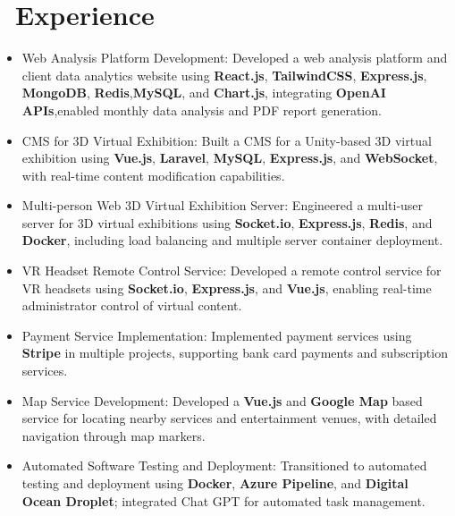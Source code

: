 \documentclass{resume}
\begin{document}
\section{\faUsers\ Experience}
\begin{itemize}[noitemsep]
  \item Web Analysis Platform Development: Developed a web analysis platform and client data analytics website using \textbf{React.js}, \textbf{TailwindCSS}, \textbf{Express.js}, \textbf{MongoDB}, \textbf{Redis},\textbf{MySQL}, and \textbf{Chart.js}, integrating \textbf{OpenAI APIs},enabled monthly data analysis and PDF report generation.
  \item CMS for 3D Virtual Exhibition: Built a CMS for a Unity-based 3D virtual exhibition using \textbf{Vue.js}, \textbf{Laravel}, \textbf{MySQL}, \textbf{Express.js}, and \textbf{WebSocket}, with real-time content modification capabilities.
  \item Multi-person Web 3D Virtual Exhibition Server: Engineered a multi-user server for 3D virtual exhibitions using \textbf{Socket.io}, \textbf{Express.js}, \textbf{Redis}, and \textbf{Docker}, including load balancing and multiple server container deployment.
  \item VR Headset Remote Control Service: Developed a remote control service for VR headsets using \textbf{Socket.io}, \textbf{Express.js}, and \textbf{Vue.js}, enabling real-time administrator control of virtual content.
  \item Payment Service Implementation: Implemented payment services using \textbf{Stripe} in multiple projects, supporting bank card payments and subscription services.
  \item Map Service Development: Developed a \textbf{Vue.js} and \textbf{Google Map} based service for locating nearby services and entertainment venues, with detailed navigation through map markers.
  \item Automated Software Testing and Deployment: Transitioned to automated testing and deployment using \textbf{Docker}, \textbf{Azure Pipeline}, and \textbf{Digital Ocean Droplet}; integrated Chat GPT for automated task management.
\end{itemize}
\end{document}
